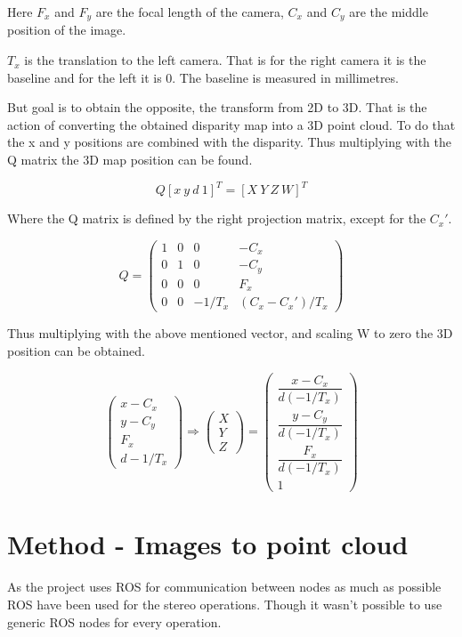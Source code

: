 Here $F_{x}$ and $F_{y}$ are the focal length of the camera, $C_{x}$ and $C_{y}$ are the middle position of the image.

$T_{x}$ is the translation to the left camera. That is for the right camera it is the baseline and for the left it is 0. The baseline is measured in millimetres. 

But goal is to obtain the opposite, the transform from 2D to 3D. That is the action of converting the obtained disparity map into a 3D point cloud. To do that the x and y positions are combined with the disparity. Thus multiplying with the Q matrix the 3D map position can be found.

\[ Q [ x \ y \ d \ 1 ]^{T} = [ X \ Y \ Z \ W ]^{T} \]

Where the Q matrix is defined by the right projection matrix, except for the $C_{x}'$.

\[
Q =
 \begin{pmatrix}
  1 & 0 & 0 & -C_{x} \\
  0 & 1 & 0 & -C_{y} \\
  0 & 0 & 0 & F_{x} \\
  0 & 0 & -1/T_{x} & (C_{x}-C_{x}')/T_{x} 
 \end{pmatrix}
\]

Thus multiplying with the above mentioned vector, and scaling W to zero the 3D position can be obtained.

\[
 \begin{pmatrix}
  x - C_{x} \\
  y - C_{y} \\
  F_{x} \\
  d-1/T_{x} 
 \end{pmatrix}
 \Rightarrow
  \begin{pmatrix}  
  X\\
  Y\\
  Z
 \end{pmatrix}
 =
 \begin{pmatrix}
  \dfrac{x - C_{x}}{ d(-1/T_{x})}  \\
  \dfrac{y - C_{y} }{ d(-1/T_{x})}\\
  \dfrac{F_{x}}{ d(-1/T_{x})}\\
  1
 \end{pmatrix}
\]

\section{Method - Images to point cloud}

As the project uses ROS for communication between nodes as much as possible ROS have been used for the stereo operations. Though it wasn't possible to use generic ROS nodes for every operation.

